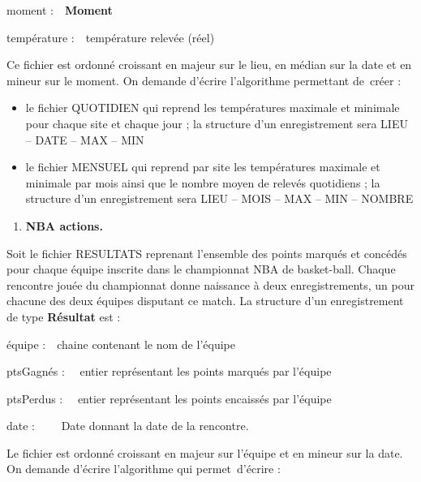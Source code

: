 {
moment :\ \ \textbf{Moment}}

{
température :\ \ température relevée (réel)}

{
Ce fichier est ordonné croissant en majeur sur le lieu, en médian sur la
date et en mineur sur le moment. On demande d’écrire l’algorithme
permettant de~créer :}

\liststyleListv
\begin{itemize}
\item {
le fichier QUOTIDIEN qui reprend les températures maximale et minimale
pour chaque site et chaque jour ; la structure d’un enregistrement sera
LIEU – DATE – MAX – MIN}
\item {
le fichier MENSUEL qui reprend par site les températures maximale et
minimale par mois ainsi que le nombre moyen de relevés quotidiens ; la
structure d’un enregistrement sera LIEU – MOIS – MAX – MIN – NOMBRE}
\end{itemize}

\bigskip


\bigskip

\liststyleExercice
\begin{enumerate}
\item {\sffamily\bfseries
NBA actions.}
\end{enumerate}
{
Soit le fichier RESULTATS reprenant l’ensemble des points marqués et
concédés pour chaque équipe inscrite dans le championnat NBA de
basket-ball. Chaque rencontre jouée du championnat donne naissance à
deux enregistrements, un pour chacune des deux équipes disputant ce
match. La structure d’un enregistrement de type \textbf{Résultat} est
:}

{
équipe :\ \ chaine contenant le nom de l’équipe}

{
ptsGagnés : \ \ entier représentant les points marqués par l’équipe}

{
ptsPerdus : \ \ entier représentant les points encaissés par l’équipe}

{
date : \ \ \ \ Date donnant la date de la rencontre.}

{
Le fichier est ordonné croissant en majeur sur l'équipe
et en mineur sur la date. On demande d’écrire l’algorithme qui
permet~d’écrire :}

